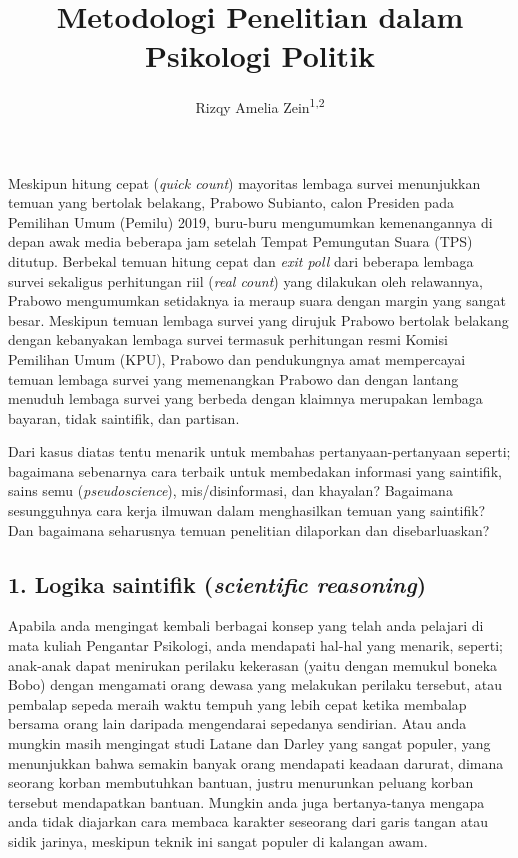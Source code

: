 \documentclass[
  english,
  man]{apa6}
\author{Rizqy Amelia Zein\textsuperscript{1,2}}
\affiliation{
\vspace{0.5cm}
\textsuperscript{1} Departemen Psikologi Kepribadian dan Sosial, Fakultas Psikologi Universitas Airlangga\\\textsuperscript{2} Institute for Globally Distributed Open Research and Education (IGDORE)}
\title{Metodologi Penelitian dalam Psikologi Politik}
\date{}
\begin{document}
\maketitle

Meskipun hitung cepat (\emph{quick count}) mayoritas lembaga survei menunjukkan temuan yang bertolak belakang, Prabowo Subianto, calon Presiden pada Pemilihan Umum (Pemilu) 2019, buru-buru mengumumkan kemenangannya di depan awak media beberapa jam setelah Tempat Pemungutan Suara (TPS) ditutup. Berbekal temuan hitung cepat dan \emph{exit poll} dari beberapa lembaga survei sekaligus perhitungan riil (\emph{real count}) yang dilakukan oleh relawannya, Prabowo mengumumkan setidaknya ia meraup suara dengan margin yang sangat besar. Meskipun temuan lembaga survei yang dirujuk Prabowo bertolak belakang dengan kebanyakan lembaga survei termasuk perhitungan resmi Komisi Pemilihan Umum (KPU), Prabowo dan pendukungnya amat mempercayai temuan lembaga survei yang memenangkan Prabowo dan dengan lantang menuduh lembaga survei yang berbeda dengan klaimnya merupakan lembaga bayaran, tidak saintifik, dan partisan.

Dari kasus diatas tentu menarik untuk membahas pertanyaan-pertanyaan seperti; bagaimana sebenarnya cara terbaik untuk membedakan informasi yang saintifik, sains semu (\emph{pseudoscience}), mis/disinformasi, dan khayalan? Bagaimana sesungguhnya cara kerja ilmuwan dalam menghasilkan temuan yang saintifik? Dan bagaimana seharusnya temuan penelitian dilaporkan dan disebarluaskan?

\hypertarget{logika-saintifik-scientific-reasoning}{%
\subsection{\texorpdfstring{1. Logika saintifik (\emph{scientific reasoning})}{1. Logika saintifik (scientific reasoning)}}\label{logika-saintifik-scientific-reasoning}}

Apabila anda mengingat kembali berbagai konsep yang telah anda pelajari di mata kuliah Pengantar Psikologi, anda mendapati hal-hal yang menarik, seperti; anak-anak dapat menirukan perilaku kekerasan (yaitu dengan memukul boneka Bobo) dengan mengamati orang dewasa yang melakukan perilaku tersebut, atau pembalap sepeda meraih waktu tempuh yang lebih cepat ketika membalap bersama orang lain daripada mengendarai sepedanya sendirian. Atau anda mungkin masih mengingat studi Latane dan Darley yang sangat populer, yang menunjukkan bahwa semakin banyak orang mendapati keadaan darurat, dimana seorang korban membutuhkan bantuan, justru menurunkan peluang korban tersebut mendapatkan bantuan. Mungkin anda juga bertanya-tanya mengapa anda tidak diajarkan cara membaca karakter seseorang dari garis tangan atau sidik jarinya, meskipun teknik ini sangat populer di kalangan awam.
\end{document}

